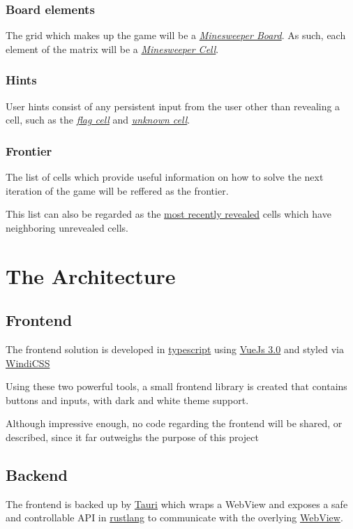 \documentclass{article}
\begin{document}
		\subsubsection{Board elements}
		The grid which makes up the game will be a \underline{\textit{Minesweeper Board}}. As such, each element of the matrix will be a \underline{\textit{Minesweeper Cell}}.
		
		\subsubsection{Hints}
		User hints consist of any persistent input from the user other than revealing a cell, such as the \underline{\textit{flag cell}} and \underline{\textit{unknown cell}}.
		
		\subsubsection{Frontier}
        The list of cells which provide useful information on how to solve the next iteration of the game will be reffered as the frontier.
        
        This list can also be regarded as the \underline{most recently revealed} cells which have neighboring unrevealed cells.

\section{The Architecture}
    \subsection{Frontend}
        The frontend solution is developed in \underline{typescript} using \href{https://v3.vuejs.org/}{VueJs 3.0} and styled via \href{https://windicss.org/}{WindiCSS}
        
        Using these two powerful tools, a small frontend library is created that contains buttons and inputs, with dark and white theme support.

        Although impressive enough, no code regarding the frontend will be shared, or described, since it far outweighs the purpose of this project
        
    \subsection{Backend}
        The frontend is backed up by \href{https://tauri.studio/en/}{Tauri} which wraps a WebView and exposes a safe and controllable API in \underline{rustlang} to communicate with the overlying \underline{WebView}.
        
\end{document}
